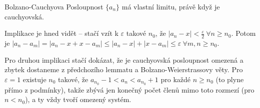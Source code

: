 \begin{vetaN}{Bolzano-Cauchyova}
Posloupnost $\{a_n\}$ má vlastní limitu, právě když je cauchyovská.

\medskip\begin{dukaz}
\begin{penumerate}
    \item Implikace \uv{$\Rightarrow$} je hned vidět -- stačí vzít k $\varepsilon$ takové $n_0$, že $|a_n-x|<\frac{\varepsilon}{2}\ \forall n\geq n_0$. Potom je $|a_n-a_m|=|a_n-x+x-a_m|\leq|a_n-x|+|x-a_m|\leq\varepsilon\ \forall m,n\geq n_0$.\medskip
    \item Pro druhou implikaci stačí dokázat, že je cauchyovská posloupnost omezená a zbytek dostaneme z předchozího lemmatu a Bolzano-Weierstrassovy věty. Pro $\varepsilon=1$ existuje $n_0$ takové, že $a_{n_0}-1<a_n<a_{n_0}+1$ pro každé $n\geq n_0$ (to plyne přímo z podmínky), takže zbývá jen konečný počet členů mimo toto rozmezí (pro $n<n_0$), a ty vždy tvoří omezený systém.
\end{penumerate}
\end{dukaz}
\end{vetaN}

